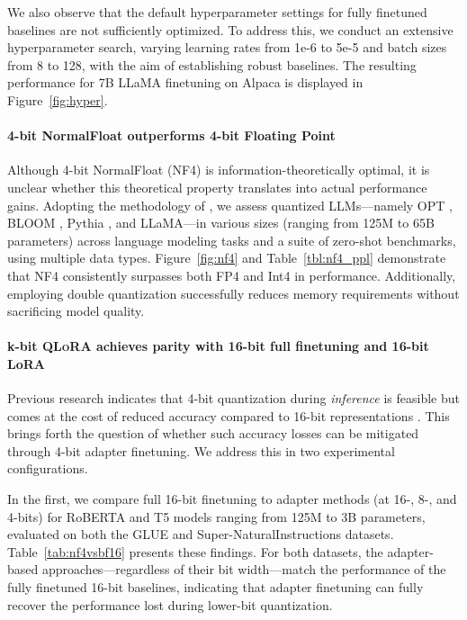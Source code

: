 We also observe that the default hyperparameter settings for fully finetuned baselines are not sufficiently optimized. To address this, we conduct an extensive hyperparameter search, varying learning rates from 1e-6 to 5e-5 and batch sizes from 8 to 128, with the aim of establishing robust baselines. The resulting performance for 7B LLaMA finetuning on Alpaca is displayed in Figure~\ref{fig:hyper}.

\paragraph{4-bit NormalFloat outperforms 4-bit Floating Point} 

Although 4-bit NormalFloat (NF4) is information-theoretically optimal, it is unclear whether this theoretical property translates into actual performance gains. Adopting the methodology of \citet{dettmers2022case}, we assess quantized LLMs—namely OPT \citep{zhang2022opt}, BLOOM \cite{scao2022bloom}, Pythia \cite{biderman2023pythia}, and LLaMA—in various sizes (ranging from 125M to 65B parameters) across language modeling tasks and a suite of zero-shot benchmarks, using multiple data types. Figure~\ref{fig:nf4} and Table~\ref{tbl:nf4_ppl} demonstrate that NF4 consistently surpasses both FP4 and Int4 in performance. Additionally, employing double quantization successfully reduces memory requirements without sacrificing model quality.

\paragraph{k-bit \textsc{QLoRA} achieves parity with 16-bit full finetuning and 16-bit LoRA} Previous research indicates that 4-bit quantization during \emph{inference} is feasible but comes at the cost of reduced accuracy compared to 16-bit representations \citep{dettmers2022case,frantar2022gptq}. This brings forth the question of whether such accuracy losses can be mitigated through 4-bit adapter finetuning. We address this in two experimental configurations.

In the first, we compare full 16-bit finetuning to adapter methods (at 16-, 8-, and 4-bits) for RoBERTA and T5 models ranging from 125M to 3B parameters, evaluated on both the GLUE and Super-NaturalInstructions datasets. Table~\ref{tab:nf4vsbf16} presents these findings. For both datasets, the adapter-based approaches—regardless of their bit width—match the performance of the fully finetuned 16-bit baselines, indicating that adapter finetuning can fully recover the performance lost during lower-bit quantization.

